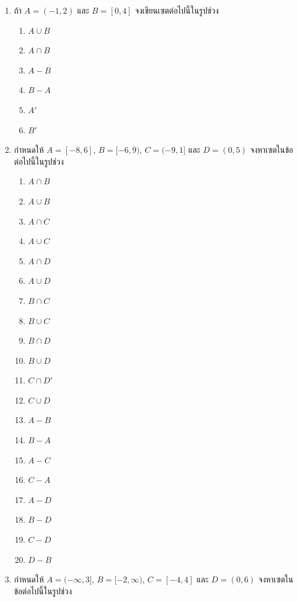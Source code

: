 \begin{enumerate}[label=\arabic*., leftmargin=*]
	\item ถ้า $A = (-1, 2)$ และ $B = [0, 4]$ จงเขียนเซตต่อไปนี้ในรูปช่วง
	\begin{multicols}{2}
	\begin{enumerate}[label=\theenumi\arabic*), leftmargin=*]
	\item $A \cup B$
	\item $A \cap B$
	\item $A - B$
	\item $B - A$
	\item $A'$
	\item $B'$
\end{enumerate}
	\end{multicols}
\item กำหนดให้ $A = [-8, 6]$, $B = [-6, 9)$, $C = (-9, 1]$ และ $D = (0, 5)$ จงหาเซตในข้อต่อไปนี้ในรูปช่วง
\begin{multicols}{2}
	\begin{enumerate}[label=\theenumi\arabic*), leftmargin=*]
		\item $A \cap B$
		\item $A \cup B$
		\item $A \cap C$
		\item $A \cup C$
		\item $A \cap D$
		\item $A \cup D$
		\item $B \cap C$
		\item $B \cup C$
		\item $B \cap D$
		\item $B \cup D$
		\item $C \cap D'$
		\item $C \cup D$
		\item $A - B$
		\item $B - A$
		\item $A - C$
		\item $C - A$
		\item $A - D$
		\item $B - D$
		\item $C - D$
		\item $D - B$
	\end{enumerate}
\end{multicols}
\item กำหนดให้ $A = (-\infty, 3]$, $B = [-2, \infty)$, $C = [-4, 4]$ และ $D = (0, 6)$ จงหาเซตในข้อต่อไปนี้ในรูปช่วง
\begin{multicols}{2}
	\begin{enumerate}[label=\theenumi\arabic*), leftmargin=*]

\end{enumerate}
\end{multicols}
\end{enumerate}
